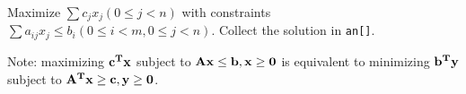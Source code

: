 Maximize $\sum c_jx_j(0\le j<n)$ with constraints $\sum a_{ij}x_j\le b_i(0\le i<m,0\le j<n)$. Collect the solution in \texttt{an[]}.

Note: maximizing $\bf c^Tx$ subject to $\bf Ax\leq b,\bf x\geq 0$ is equivalent to minimizing $\bf b^Ty$ subject to $\bf A^Tx\geq c,\bf y\geq 0$. 


